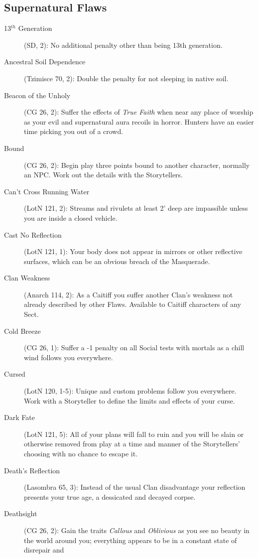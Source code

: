 \subsection{Supernatural Flaws}
\begin{description}
	\item[13$^{th}$ Generation] (SD, 2):  No additional penalty other than being 13th 
	generation.
	\item[Ancestral Soil Dependence] (Tzimisce 70, 2):  Double the penalty for not sleeping in native 
	soil.
	\item[Beacon of the Unholy] (CG 26, 2):  Suffer the effects of \emph{True Faith} when near any place 
	of worship as your evil and supernatural aura recoils in horror.  Hunters have an easier time 
	picking you out of a crowd.
	\item[Bound] (CG 26, 2):  Begin play three points bound to another character, normally an NPC. Work 
	out the details with the Storytellers.
	\item[Can't Cross Running Water] (LotN 121, 2):  Streams and rivulets at least 2' deep are impassible 
	unless you are inside a closed vehicle.
	\item[Cast No Reflection] (LotN 121, 1):  Your body does not appear in mirrors or other reflective 
	surfaces, which can be an obvious breach of the Masquerade.
	\item[Clan Weakness] (Anarch 114, 2):  As a Caitiff you suffer another Clan's weakness not already described 
	by other Flaws.  Available to Caitiff characters of any Sect.
	\item[Cold Breeze] (CG 26, 1):  Suffer a -1 penalty on all Social tests with mortals as a chill wind 
	follows you everywhere.
	\item[Cursed] (LotN 120, 1-5):  Unique and custom problems follow you everywhere.  Work with a 
	Storyteller to define the limits and effects of your curse.
	\item[Dark Fate] (LotN 121, 5):  All of your plans will fall to ruin and you will be slain or otherwise 
	removed from play at a time and manner of the Storytellers' choosing with no chance to escape it.
	\item[Death's Reflection] (Lasombra 65, 3):  Instead of the usual Clan disadvantage your reflection 
	presents your true age, a dessicated and decayed corpse.
	\item[Deathsight] (CG 26, 2):  Gain the traits \emph{Callous} and \emph{Oblivious} as you see no 
	beauty in the world around you; everything appears to be in a constant state of disrepair and 

\end{description}
